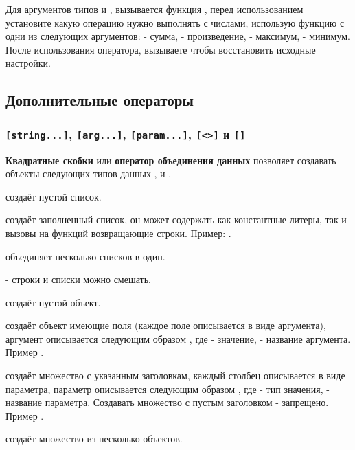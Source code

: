 \documentclass[a4paper, 14pt]{extarticle}
\begin{document}
Для аргументов типов \integer{} и \double{}, вызывается функция , перед использованием установите какую операцию нужно выполнять с числами, использую функцию  с одни из следующих аргументов:  - сумма,  - произведение,  - максимум,  - минимум. После использования оператора, вызываете  чтобы восстановить исходные настройки.

\subsection{Дополнительные операторы}

\subsubsection{\lstinline`[string...]`, \lstinline`[arg...]`, \lstinline`[param...]`, \lstinline`[<>]` и \lstinline`[]`}

{\bf Квадратные скобки} или {\bf оператор объединения данных} позволяет создавать объекты следующих типов данных \listtype{}, \set{} и \object{}.

 создаёт пустой список.

 создаёт заполненный список, он может содержать как константные литеры, так и вызовы на функций возвращающие строки. Пример: \code{["a" "b" "c"]}.

 объединяет несколько списков в один.

 - строки и списки можно смешать.

 создаёт пустой объект.

 создаёт объект имеющие поля (каждое поле описывается в виде аргумента), аргумент описывается следующим образом , где  - значение,  - название аргумента. Пример .

 создаёт множество с указанным заголовкам, каждый столбец описывается в виде параметра, параметр описывается следующим образом , где  - тип значения,  - название параметра. Создавать множество с пустым заголовком - запрещено. Пример .

 создаёт множество из несколько объектов.
\end{document}
